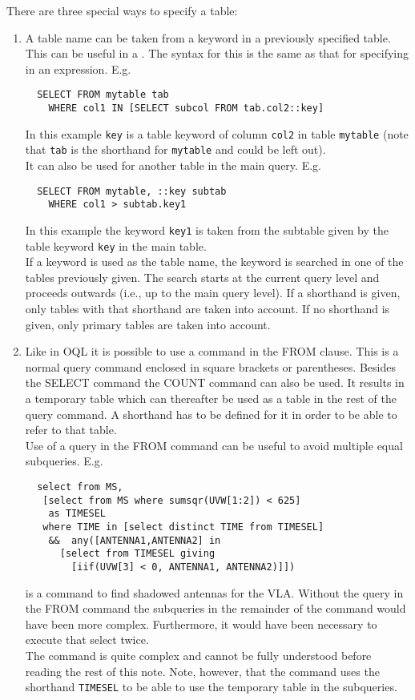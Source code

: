 There are three special ways to specify a table:
\begin{enumerate}

\item
A table name can be taken from a keyword in a previously
specified table. This can be useful in a
. The syntax for this is
the same as that for specifying 
in an expression. E.g.
\begin{verbatim}
  SELECT FROM mytable tab
    WHERE col1 IN [SELECT subcol FROM tab.col2::key]
\end{verbatim}
In this example \texttt{key} is a table keyword of column
\texttt{col2} in table \texttt{mytable} (note that \texttt{tab}
is the shorthand for \texttt{mytable} and could be left out).
\\It can also be used for another table in the main query. E.g.
\begin{verbatim}
  SELECT FROM mytable, ::key subtab
    WHERE col1 > subtab.key1
\end{verbatim}
In this example the keyword \texttt{key1} is taken from the
subtable given by the table keyword \texttt{key} in the main
table.
\\If a keyword is used as the table name, the keyword is
searched
in one of the tables previously given. The search starts at
the current query level and proceeds outwards (i.e., up to the
main query level). If a shorthand is given, only tables with
that shorthand are taken into account. If no shorthand is
given, only primary tables are taken into account.

\item
Like in OQL it is possible to use a
command in the FROM clause. This is a normal query command
enclosed in square brackets or parentheses. Besides the SELECT command
the COUNT command can also be used.
It results in a temporary table
which can thereafter be used as a table in the rest of the
query command. A shorthand has to be defined for it in order
to be able to refer to that table.
\\Use of a query in the FROM command can be useful to avoid
multiple equal subqueries. E.g.
\begin{verbatim}
  select from MS,
   [select from MS where sumsqr(UVW[1:2]) < 625]
    as TIMESEL
   where TIME in [select distinct TIME from TIMESEL]
    &&  any([ANTENNA1,ANTENNA2] in
      [select from TIMESEL giving
        [iif(UVW[3] < 0, ANTENNA1, ANTENNA2)]])
\end{verbatim}
is a command to find shadowed antennas for the VLA.
Without the query in the FROM command the subqueries in the
remainder of the command would have been more complex.
Furthermore, it would have been necessary to execute that
select twice.
\\The command is quite complex and cannot be fully understood
before reading the rest of this note.
Note, however, that the command uses the shorthand \texttt{TIMESEL}
to be able to use the temporary table in the subqueries.


\end{enumerate}
